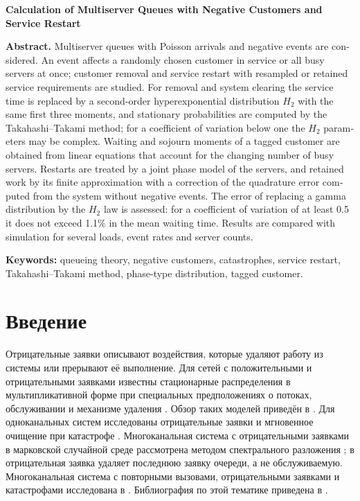 \documentclass[a4paper,12pt]{article}
\begin{document}
\begin{otherlanguage}{english}
\bigskip
\begin{center}\textbf{Calculation of Multiserver Queues with Negative Customers and Service Restart}\end{center}
\textbf{Abstract.} Multiserver queues with Poisson arrivals and negative events are considered. An event affects a randomly chosen customer in service or all busy servers at once; customer removal and service restart with resampled or retained service requirements are studied. For removal and system clearing the service time is replaced by a second-order hyperexponential distribution \(H_2\) with the same first three moments, and stationary probabilities are computed by the Takahashi--Takami method; for a coefficient of variation below one the \(H_2\) parameters may be complex. Waiting and sojourn moments of a tagged customer are obtained from linear equations that account for the changing number of busy servers. Restarts are treated by a joint phase model of the servers, and retained work by its finite approximation with a correction of the quadrature error computed from the system without negative events. The error of replacing a gamma distribution by the \(H_2\) law is assessed: for a coefficient of variation of at least 0.5 it does not exceed 1.1\% in the mean waiting time. Results are compared with simulation for several loads, event rates and server counts.

\textbf{Keywords:} queueing theory, negative customers, catastrophes, service restart, Takahashi--Takami method, phase-type distribution, tagged customer.
\end{otherlanguage}

\section{Введение}
Отрицательные заявки описывают воздействия, которые удаляют работу из системы или прерывают её выполнение. Для сетей с положительными и отрицательными заявками известны стационарные распределения в мультипликативной форме при специальных предположениях о потоках, обслуживании и механизме удаления \cite{gelenbe1991,gelenbe1992}. Обзор таких моделей приведён в \cite{artalejo2000}. Для одноканальных систем исследованы отрицательные заявки \cite{harrison1996} и мгновенное очищение при катастрофе \cite{jain1996}. Многоканальная система с отрицательными заявками в марковской случайной среде рассмотрена методом спектрального разложения \cite{chakka2001}; в \cite{bocharov2007} отрицательная заявка удаляет последнюю заявку очереди, а не обслуживаемую. Многоканальная система с повторными вызовами, отрицательными заявками и катастрофами исследована в \cite{shin2007}. Библиография по этой тематике приведена в \cite{do2011}.
\end{document}
